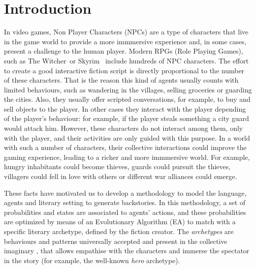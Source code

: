 \documentclass{sig-alternate}
\begin{document}






%
%
\section{Introduction}
\label{sec:intro}

In video games, Non Player Characters (NPCs)  are a type of characters
that live in the game world to provide a more immmersive
experience and, in some cases, present a challenge to the human player. Modern RPGs (Role Playing Games), such as The
Witcher\texttrademark~or Skyrim\texttrademark~ include hundreds of NPC characters. The effort to create a good interactive fiction script is directly proportional to the number of these characters. That is the reason this kind of agents usually counts with limited behaviours, such as wandering in the villages, selling groceries or guarding the cities. Also, they usually offer scripted conversations, for example, to buy and sell objects to the player. In other cases they interact with the player depending of the player's behaviour: for example, if the player steals something a city guard would attack him.  However, these characters do not interact among them, only with the player, and their activities are only guided with this purpose. In a world with such a number of characters, their collective interactions could improve the gaming experience, leading to a richer and more immmersive world. For example, hungry inhabitants could become thieves, guards could pursuit the thieves, villagers could fell in love with others or different war alliances could emerge.


These facts have motivated us to develop a methodology to model the language, agents and literary setting to generate backstories. In this methodology, a set of probabilities and
states are associated to agents' actions, and these probabilities are
optimized by means of an Evolutionary Algorithm (EA) to match with a
specific literary archetype, defined by the fiction creator. The {\em
archetypes} are behaviours and patterns universally accepted and
present in the collective imaginary
 \cite{ArchetypesGarry05}, that
allows empathise  %
with the characters and immerse the spectator in the story
(for example, the well-known {\em hero} archetype).
\end{document}
